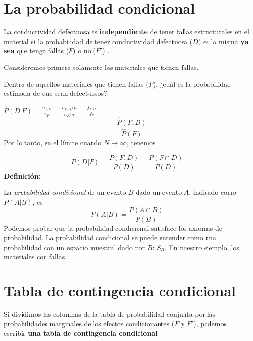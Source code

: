 \documentclass[
]{book}
\begin{document}
\hypertarget{la-probabilidad-condicional}{%
\section{La probabilidad condicional}\label{la-probabilidad-condicional}}

La conductividad defectuosa es \textbf{independiente} de tener fallas estructurales en el material si la probabilidad de tener conductividad defectuosa (\(D\)) es la misma \textbf{ya sea} que tenga fallas (\(F\)) o no (\(F'\)) .

Consideremos primero solamente los materiales que tienen fallas.

Dentro de aquellos materiales que tienen fallas (\(F\)), ¿cuál es la probabilidad estimada de que sean defectuosos?

\(\hat{P}(D|F)=\frac{n_{F,D}}{n_{F}}=\frac{n_{F,D}/n}{n_{F}/n}= \frac{f_{F,D}}{f_{F}}\)
\[= \frac{\hat{P}(F,D)}{\hat{P}(F)}\]
Por lo tanto, en el límite cuando \(N \rightarrow \infty\), tenemos

\[P(D|F)=\frac{P(F, D)}{P(D)}=\frac{P(F \cap D)}{P(D)}\]
\textbf{Definición:}

La \emph{probabilidad condicional} de un evento \(B\) dado un evento \(A\), indicado como \(P(A|B)\), es
\[P(A|B) = \frac{P(A\cap B)}{P(B)}\]
Podemos probar que la probabilidad condicional satisface los axiomas de probabilidad. La probabilidad condicional se puede entender como una probabilidad con un espacio muestral dado por \(B\): \(S_B\). En nuestro ejemplo, los materiales con fallas.

\hypertarget{tabla-de-contingencia-condicional}{%
\section{Tabla de contingencia condicional}\label{tabla-de-contingencia-condicional}}

Si dividimos las columnas de la tabla de probabilidad conjunta por las probabilidades marginales de los efectos condicionantes (\(F\) y \(F'\)), podemos escribir \textbf{una tabla de contingencia condicional}
\end{document}
